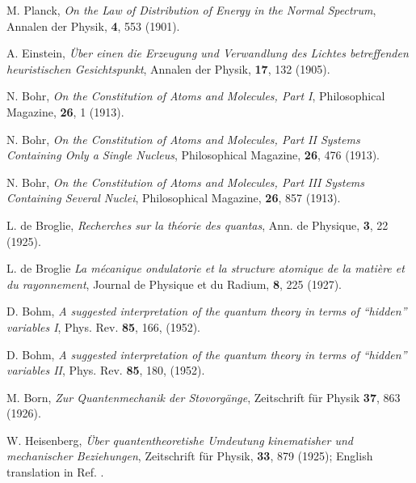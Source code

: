 \documentclass[onecolumn,nofootinbib, secnumarabic, amsmath, nobibnotes,12pt,aps,pra]{revtex4-1}
\begin{document}
\setcounter{enumiv}{0}
\begin{thebibliography}{999}

M. Planck, \emph{On the Law of Distribution of Energy in the Normal Spectrum}, Annalen der Physik, \textbf{4},   553 (1901).

A. Einstein, \emph{\"{U}ber einen die Erzeugung und Verwandlung des Lichtes betreffenden heuristischen Gesichtspunkt}, Annalen der Physik, \textbf{17},   132 (1905).

N. Bohr, \emph{On the Constitution of Atoms and Molecules, Part I}, Philosophical Magazine, \textbf{26},  1 (1913).

N. Bohr, \emph{On the Constitution of Atoms and Molecules, Part II Systems Containing Only a Single Nucleus}, Philosophical Magazine, \textbf{26},  476 (1913).

N. Bohr, \emph{On the Constitution of Atoms and Molecules, Part III Systems Containing Several Nuclei}, Philosophical Magazine, \textbf{26},  857 (1913).

L. de Broglie, \emph{Recherches sur la th\'{e}orie des quantas}, Ann. de Physique, \textbf{3},  22 (1925).

L. de Broglie \emph{La m\'{e}canique ondulatorie et la structure atomique de la mati\`ere et du rayonnement}, Journal de Physique et du Radium, \textbf{8},  225 (1927).

D. Bohm, \emph{A suggested interpretation of the quantum theory in terms of ``hidden'' variables  I}, Phys. Rev. {\bf 85},  166, (1952).

D. Bohm, \emph{A suggested interpretation of the quantum theory in terms of ``hidden'' variables  II}, Phys. Rev. {\bf 85},  180, (1952).

M. Born, \emph{Zur Quantenmechanik der Stovorg\"{a}nge}, Zeitschrift f\"{u}r Physik \textbf{37},  863 (1926).

W. Heisenberg, \emph{\"{U}ber quantentheoretishe Umdeutung kinematisher und mechanischer Beziehungen}, Zeitschrift f\"{u}r Physik, \textbf{33},  879 (1925); English translation in Ref. \cite{om.waerden}.


\end{thebibliography}
\end{document}

